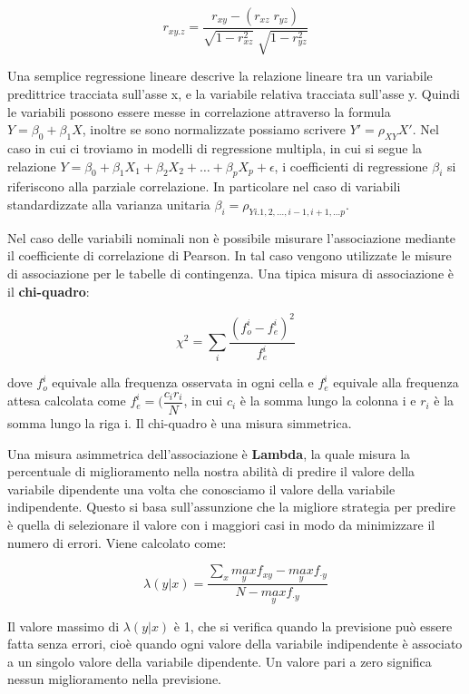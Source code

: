 \documentclass[a4paper]{extarticle}
\begin{document}
\begin{equation*}
r_{xy.z} = \dfrac{r_{xy}-(r_{xz} \; r_{yz})}{\sqrt{1-r_{xz}^2} \; \sqrt{1-r_{yz}^2}}
\end{equation*}

Una semplice regressione lineare descrive la relazione lineare tra un variabile predittrice tracciata sull'asse x, e la variabile relativa tracciata sull'asse y. Quindi le variabili possono essere messe in correlazione attraverso la formula $Y=\beta_0 + \beta_1X$, inoltre se sono normalizzate possiamo scrivere $Y' = \rho_{XY}X'$. Nel caso in cui ci troviamo in modelli di regressione multipla, in cui si segue la relazione $Y= \beta_0 + \beta_1X_1+\beta_2X_2+\dots+\beta_pX_p + \epsilon$, i coefficienti di regressione $\beta_i$ si riferiscono alla parziale correlazione. In particolare nel caso di variabili standardizzate alla varianza unitaria $\beta_i = \rho_{Yi.1,2,\dots,i-1,i+1,\dots p}$.

Nel caso delle variabili nominali non è possibile misurare l’associazione mediante il coefficiente di correlazione di Pearson. In tal caso vengono utilizzate le misure di associazione per le tabelle di contingenza. Una tipica misura di associazione è il \textbf{chi-quadro}:

\begin{equation*}
\chi^2 = \sum\limits_i \dfrac{(f^i_o-f^i_e)^2}{f^i_e}
\end{equation*}

dove $f_o^i$ equivale alla frequenza osservata in ogni cella e $f_e^i$ equivale alla frequenza attesa calcolata come $f_e^i = (\dfrac{c_i r_i}{N}$, in cui $c_i$ è la somma lungo la colonna i e $r_i$ è la somma lungo la riga i. Il chi-quadro è una misura simmetrica.

Una misura asimmetrica dell'associazione è \textbf{Lambda}, la quale misura la percentuale di miglioramento nella nostra abilità di predire il valore della variabile dipendente una volta che conosciamo il valore della variabile indipendente. Questo si basa sull'assunzione che la migliore strategia per predire è quella di selezionare il valore con i maggiori casi in modo da minimizzare il numero di errori. Viene calcolato come:

\begin{equation*}
\lambda(y|x) =  \dfrac{\sum\limits_x \underset{y}{max} f_{xy} -  \underset{y}{max} f_{\cdot y}}{N- \underset{y}{max} f_{\cdot y}}
\end{equation*}

Il valore massimo di $\lambda(y|x)$ è 1, che si verifica quando la previsione può essere fatta senza errori, cioè quando ogni valore della variabile indipendente è associato a un singolo valore della variabile dipendente. Un valore pari a zero significa nessun miglioramento nella previsione.
\end{document}
